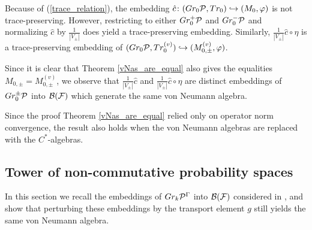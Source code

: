 \begin{rem}
Because of (\ref{trace_relation}), the embedding $\hat{c}\colon (Gr_0\mathcal{P},Tr_0)\hookrightarrow (M_0,\varphi)$ is not trace-preserving. However, restricting to either $Gr_0^+\mathcal{P}$ and $Gr_0^-\mathcal{P}$ and normalizing $\hat{c}$ by $\frac{1}{|V_\pm|}$ does yield a trace-preserving embedding. Similarly, $\frac{1}{|V_\pm|}\hat{c}\circ\eta$ is a trace-preserving embedding of $(Gr_0\mathcal{P},Tr_0^{(v)})\hookrightarrow (M_{0,\pm}^{(v)},\varphi)$.

Since it is clear that Theorem \ref{vNas_are_equal} also gives the equalities $M_{0,\pm}=M_{0,\pm}^{(v)}$, we observe that $\frac{1}{|V_\pm|}\hat{c}$ and $\frac{1}{|V_\pm|}\hat{c}\circ\eta$ are distinct embeddings of $Gr_0^\pm\mathcal{P}$ into $\mathcal B(\mathcal{F})$ which generate the same von Neumann algebra.
\end{rem}



\begin{rem}
Since the proof Theorem \ref{vNas_are_equal} relied only on operator norm convergence, the result also holds when the von Neumann algebras are replaced with the $C^*$-algebras.
\end{rem}















\subsection{Tower of non-commutative probability spaces}

In this section we recall the embeddings of $Gr_k\mathcal{P}^\Gamma$ into $\mathcal B(\mathcal{F})$ considered in \cite{GJS10}, and show that perturbing these embeddings by the transport element $g$ still yields the same von Neumann algebra.

